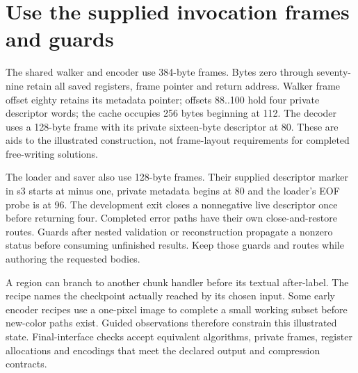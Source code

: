 \section{Use the supplied invocation frames and guards}
The shared walker and encoder use 384-byte frames. Bytes zero through seventy-nine
retain all saved registers, frame pointer and return address. Walker frame offset eighty
retains its metadata pointer; offsets 88..100 hold four private descriptor words; the
cache occupies 256 bytes beginning at 112. The decoder uses a 128-byte frame with its
private sixteen-byte descriptor at 80. These are aids to the illustrated construction,
not frame-layout requirements for completed free-writing solutions.

The loader and saver also use 128-byte frames. Their supplied descriptor marker in s3
starts at minus one, private metadata begins at 80 and the loader's EOF probe is at 96.
The development exit closes a nonnegative live descriptor once before returning four.
Completed error paths have their own close-and-restore routes. Guards after nested
validation or reconstruction propagate a nonzero status before consuming unfinished
results. Keep those guards and routes while authoring the requested bodies.

A region can branch to another chunk handler before its textual after-label. The recipe
names the checkpoint actually reached by its chosen input. Some early encoder recipes
use a one-pixel image to complete a small working subset before new-color paths exist.
Guided observations therefore constrain this illustrated state. Final-interface checks
accept equivalent algorithms, private frames, register allocations and encodings that
meet the declared output and compression contracts.
